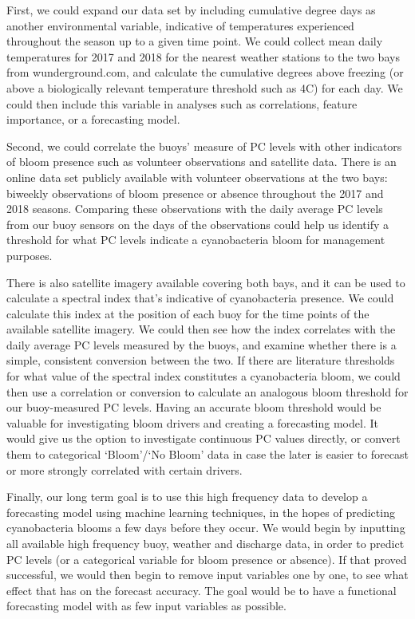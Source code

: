 \documentclass[]{article}
\begin{document}
First, we could expand our data set by including cumulative degree days
as another environmental variable, indicative of temperatures
experienced throughout the season up to a given time point. We could
collect mean daily temperatures for 2017 and 2018 for the nearest
weather stations to the two bays from wunderground.com, and calculate
the cumulative degrees above freezing (or above a biologically relevant
temperature threshold such as 4C) for each day. We could then include
this variable in analyses such as correlations, feature importance, or a
forecasting model.

Second, we could correlate the buoys' measure of PC levels with other
indicators of bloom presence such as volunteer observations and
satellite data. There is an online data set publicly available with
volunteer observations at the two bays: biweekly observations of bloom
presence or absence throughout the 2017 and 2018 seasons. Comparing
these observations with the daily average PC levels from our buoy
sensors on the days of the observations could help us identify a
threshold for what PC levels indicate a cyanobacteria bloom for
management purposes.

There is also satellite imagery available covering both bays, and it can
be used to calculate a spectral index that's indicative of cyanobacteria
presence. We could calculate this index at the position of each buoy for
the time points of the available satellite imagery. We could then see
how the index correlates with the daily average PC levels measured by
the buoys, and examine whether there is a simple, consistent conversion
between the two. If there are literature thresholds for what value of
the spectral index constitutes a cyanobacteria bloom, we could then use
a correlation or conversion to calculate an analogous bloom threshold
for our buoy-measured PC levels. Having an accurate bloom threshold
would be valuable for investigating bloom drivers and creating a
forecasting model. It would give us the option to investigate continuous
PC values directly, or convert them to categorical `Bloom'/`No Bloom'
data in case the later is easier to forecast or more strongly correlated
with certain drivers.

Finally, our long term goal is to use this high frequency data to
develop a forecasting model using machine learning techniques, in the
hopes of predicting cyanobacteria blooms a few days before they occur.
We would begin by inputting all available high frequency buoy, weather
and discharge data, in order to predict PC levels (or a categorical
variable for bloom presence or absence). If that proved successful, we
would then begin to remove input variables one by one, to see what
effect that has on the forecast accuracy. The goal would be to have a
functional forecasting model with as few input variables as possible.
\end{document}
